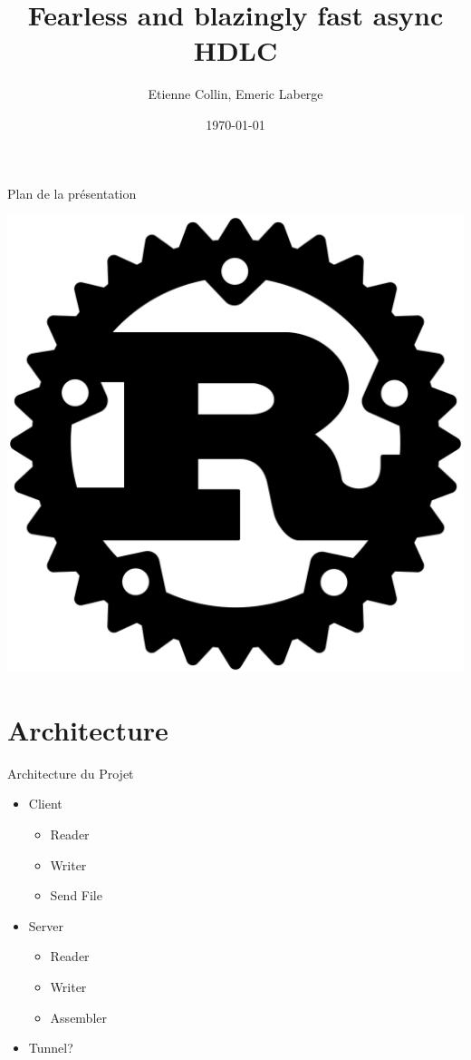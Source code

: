 \documentclass{beamer}
\title{Fearless and blazingly fast async HDLC}
\author{Etienne Collin, Emeric Laberge}
\date{\today}
\begin{document}
\maketitle

\begin{frame}{Plan de la présentation}
	\begin{minipage}[c]{0.6\textwidth}
		\vfill
		\tableofcontents
		\vfill
	\end{minipage}%
	\hfill
	\begin{minipage}[c]{0.4\textwidth}
		\vfill
		\includegraphics[width=0.2\paperwidth]{rust.png}
		\vfill
	\end{minipage}
\end{frame}

\section{Architecture}
\begin{frame}{Architecture du Projet}
	\begin{itemize}
		\item Client
		      \begin{itemize}
			      \item Reader
			      \item Writer
			      \item Send File
		      \end{itemize}
		\item Server
		      \begin{itemize}
			      \item Reader
			      \item Writer
			      \item Assembler
		      \end{itemize}
		\item Tunnel?
	\end{itemize}
\end{frame}
\end{document}
